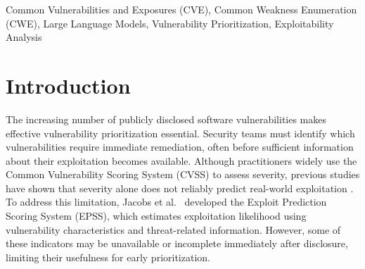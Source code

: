 \documentclass[conference,compsoc]{IEEEtran}
\begin{document}
\begin{abstract}
Given limited security resources and the growing
number of disclosed vulnerabilities, organizations
must prioritize vulnerabilities for remediation.
Although the National Vulnerability Database (NVD)
provides severity assessments, vulnerability severity
does not necessarily reflect the likelihood of
exploitation in the wild. In this paper, we investigate
the relationship between real-world exploitation
and Common Weakness Enumeration (CWE) categories,
which characterize the underlying root causes of
software vulnerabilities. We propose a framework
that prioritizes newly disclosed vulnerabilities
based on the historical exploitation rates of CVEs
associated with their CWE categories. We analyze
192,788 CVEs across 768 CWEs, including 3,097
exploited vulnerabilities, to assess the temporal
stability of CWE-level exploitation patterns.
To address missing or delayed CWE assignments,
we introduce HiCWE, a hierarchy-aware bi-encoder
that automatically maps CVE descriptions to CWE
definitions, achieving 75.3\% top-1 classification
accuracy. We further evaluate historical CWE-based
prioritization using official NVD CWE assignments
and rolling temporal evaluations from 2021 to 2025,
achieving ROC-AUC scores between 0.692 and 0.727.
Our findings establish historical CWE exploitability
as a useful complementary signal and provide a
framework for incorporating root-cause information
into early vulnerability prioritization.

\end{abstract}

\begin{IEEEkeywords}
Common Vulnerabilities and Exposures (CVE),
Common Weakness Enumeration (CWE),
Large Language Models,
Vulnerability Prioritization,
Exploitability Analysis
\end{IEEEkeywords}

\IEEEpeerreviewmaketitle


\section{Introduction}
\label{sec:introduction}

The increasing number of publicly disclosed software
vulnerabilities makes effective vulnerability
prioritization essential. Security teams must identify
which vulnerabilities require immediate remediation,
often before sufficient information about their
exploitation becomes available. Although practitioners
widely use the Common Vulnerability Scoring System
(CVSS) to assess severity, previous studies have shown
that severity alone does not reliably predict
real-world exploitation
\cite{jacobs2023epss,sherif2026kri,jiang2025survey}.
To address this limitation, Jacobs et
al.~\cite{jacobs2023epss} developed the Exploit
Prediction Scoring System (EPSS), which estimates
exploitation likelihood using vulnerability
characteristics and threat-related information.
However, some of these indicators may be unavailable
or incomplete immediately after disclosure,
limiting their usefulness for early prioritization.
\end{document}

